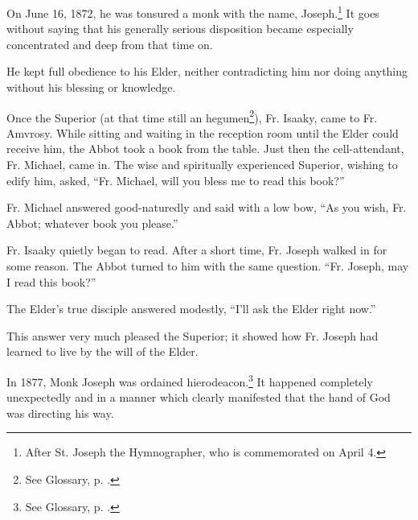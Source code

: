 On June 16, 1872, he was tonsured a monk with the name, Joseph.\footnote{After St. Joseph the Hymnographer, who is commemorated on April 4.} It goes without saying that his generally serious disposition became especially concentrated and deep from that time on.

He kept full obedience to his Elder, neither contradicting him nor doing anything without his blessing or knowledge.

Once the Superior (at that time still an hegumen\footnote{See Glossary, p. \pageref{hegumen}.}), Fr. Isaaky, came to Fr. Amvrosy. While sitting and waiting in the reception room until the Elder could receive him, the Abbot took a book from the table. Just then the cell-attendant, Fr. Michael, came in. The wise and spiritually experienced Superior, wishing to edify him, asked, ``Fr. Michael, will you bless me to read this book?''

Fr. Michael answered good-naturedly and said with a low bow, ``As you wish, Fr. Abbot; whatever book you please.''

Fr. Isaaky quietly began to read. After a short time, Fr. Joseph walked in for some reason. The Abbot turned to him with the same question. ``Fr. Joseph, may I read this book?''

The Elder's true disciple answered modestly, ``I'll ask the Elder right now.''

This answer very much pleased the Superior; it showed how Fr. Joseph had learned to live by the will of the Elder.

In 1877, Monk Joseph was ordained hierodeacon.\footnote{See Glossary, p. \pageref{hierodeacon}.} It happened completely unexpectedly and in a manner which clearly manifested that the hand of God was directing his way.

